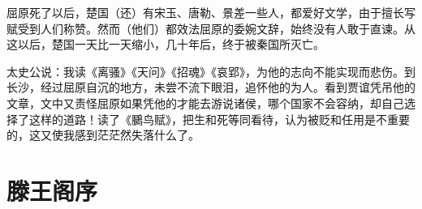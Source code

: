 \documentclass[12pt,UTF-8,openany,a4]{ctexbook}
\begin{document}
\begin{large}
    屈原死了以后，楚国（还）有宋玉、唐勒、景差一些人，都爱好文学，由于擅长写赋受到人们称赞。然而（他们）都效法屈原的委婉文辞，始终没有人敢于直谏。从这以后，楚国一天比一天缩小，几十年后，终于被秦国所灭亡。
    
    太史公说：我读《离骚》《天问》《招魂》《哀郢》，为他的志向不能实现而悲伤。到长沙，经过屈原自沉的地方，未尝不流下眼泪，追怀他的为人。看到贾谊凭吊他的文章，文中又责怪屈原如果凭他的才能去游说诸侯，哪个国家不会容纳，却自己选择了这样的道路！读了《鵩鸟赋》，把生和死等同看待，认为被贬和任用是不重要的，这又使我感到茫茫然失落什么了。
    
\end{large}



\chapter{滕王阁序}
\end{document}
